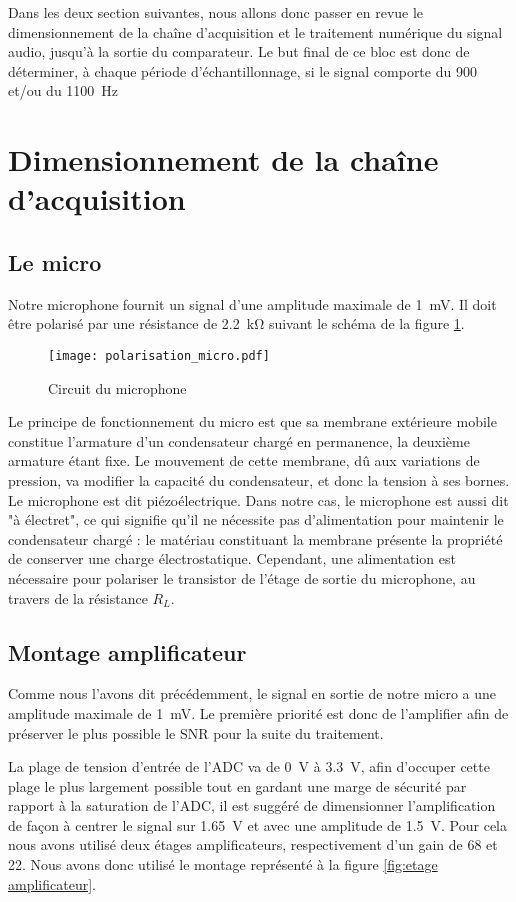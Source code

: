 Dans les deux section suivantes, nous allons donc passer en revue le dimensionnement de la chaîne d'acquisition et le traitement numérique du signal audio, jusqu'à la sortie du comparateur. Le but final de ce bloc est donc de déterminer, à chaque période d'échantillonnage, si le signal comporte du 900 et/ou du \SI{1100}{\hertz}

\section{Dimensionnement de la chaîne d'acquisition}

\subsection{Le micro}
Notre microphone fournit un signal d'une amplitude maximale de \SI{1}{\milli\volt}. Il doit être polarisé par une résistance de \SI{2.2}{\kilo\ohm} suivant le schéma de la figure \ref{fig:polarisation du micro}.
\begin{figure}[htbp]
\centering
\texttt{[image: polarisation\_micro.pdf]}
\caption{Circuit du microphone}
\label{fig:polarisation du micro}
\end{figure}

Le principe de fonctionnement du micro est que sa membrane extérieure mobile constitue l'armature d'un condensateur chargé en permanence, la deuxième armature étant fixe. Le mouvement de cette membrane, dû aux variations de pression, va modifier la capacité du condensateur, et donc la tension à ses bornes. Le microphone est dit piézoélectrique. Dans notre cas, le microphone est aussi dit "à électret", ce qui signifie qu'il ne nécessite pas d'alimentation pour maintenir le condensateur chargé : le matériau constituant la membrane présente la propriété de conserver une charge électrostatique. Cependant, une alimentation est nécessaire pour polariser le transistor de l'étage de sortie du microphone, au travers de la résistance $R_L$.

\subsection{Montage amplificateur}
Comme nous l'avons dit précédemment, le signal en sortie de notre micro a une amplitude maximale de \SI{1}{\milli\volt}. Le première priorité est donc de l'amplifier afin de préserver le plus possible le SNR pour la suite du traitement.

La plage de tension d'entrée de l'ADC va de \SI{0}{\volt} à \SI{3.3}{\volt}, afin d'occuper cette plage le plus largement possible tout en gardant une marge de sécurité par rapport à la saturation de l'ADC, il est suggéré de dimensionner l'amplification  de façon à centrer le signal sur \SI{1.65}{\volt} et avec une amplitude de \SI{1.5}{\volt}. Pour cela nous avons utilisé deux étages amplificateurs, respectivement d'un gain de 68 et 22. Nous avons donc utilisé le montage représenté à la figure \ref{fig:etage amplificateur}.


